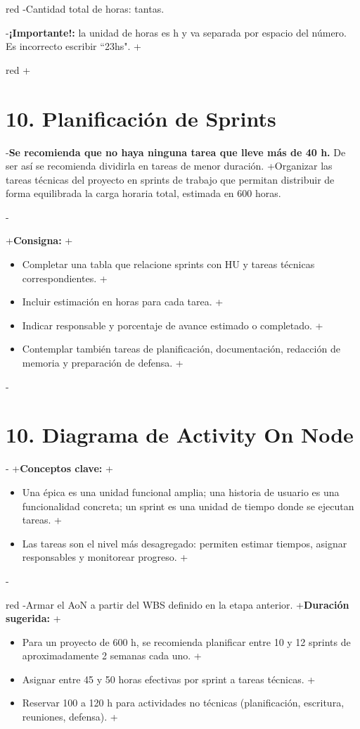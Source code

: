 \documentclass[
 11pt, %
-%
+codirector, %
 ]{charter}
\begin{document}
\begin{table}[ht]
\begin{table}[ht]
\begin{consigna}{red}
-Cantidad total de horas: tantas.
 
-\textbf{¡Importante!:} la unidad de horas es h y va separada por espacio del número. Es incorrecto escribir ``23hs".
+\begin{consigna}{red}
+\section{10. Planificación de Sprints}
 
-\textbf{Se recomienda que no haya ninguna tarea que lleve más de 40 h.} De ser así se recomienda dividirla en tareas de menor duración.
+Organizar las tareas técnicas del proyecto en sprints de trabajo que permitan distribuir de forma equilibrada la carga horaria total, estimada en 600 horas.
 
-\end{consigna}
+\textbf{Consigna:}
+\begin{itemize}
+  \item Completar una tabla que relacione sprints con HU y tareas técnicas correspondientes.
+  \item Incluir estimación en horas para cada tarea.
+  \item Indicar responsable y porcentaje de avance estimado o completado.
+  \item Contemplar también tareas de planificación, documentación, redacción de memoria y preparación de defensa.
+\end{itemize}
 
-\section{10. Diagrama de Activity On Node}
-\label{sec:AoN}
+\textbf{Conceptos clave:}
+\begin{itemize}
+  \item Una \'{e}pica es una unidad funcional amplia; una historia de usuario es una funcionalidad concreta; un sprint es una unidad de tiempo donde se ejecutan tareas.
+  \item Las tareas son el nivel más desagregado: permiten estimar tiempos, asignar responsables y monitorear progreso.
+\end{itemize}
 
-\begin{consigna}{red}
-Armar el AoN a partir del WBS definido en la etapa anterior.
+\textbf{Duración sugerida:}
+\begin{itemize}
+  \item Para un proyecto de 600 h, se recomienda planificar entre 10 y 12 sprints de aproximadamente 2 semanas cada uno.
+  \item Asignar entre 45 y 50 horas efectivas por sprint a tareas técnicas.
+  \item Reservar 100 a 120 h para actividades no técnicas (planificación, escritura, reuniones, defensa).
+\end{itemize}
 

\end{consigna}
\end{consigna}
\end{table}
\end{table}
\end{document}
